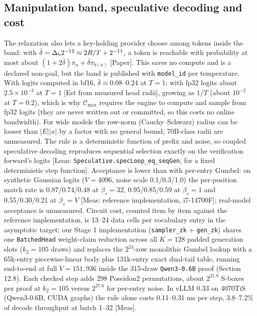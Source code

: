 \documentclass[10pt]{article}
\begin{document}
\subsection{Manipulation band, speculative decoding and cost}
The relaxation also lets a key-holding provider choose among tokens inside the band: with $\bar\delta=\Delta_{\rm b}2^{-12}\approx2R/T+2^{-11}$, a token is reachable with probability at most about $(1+2\bar\delta)\pi_u+\bar\delta\pi_{b(u)}$ [Paper]. This saves no compute and is a declared non-goal, but the band is published with \texttt{model\_\allowbreak{}id} per temperature. With logits computed in bf16, $\bar\delta\approx0.08$--$0.24$ at $T=1$; with fp32 logits about $2.5\times10^{-3}$ at $T=1$ [Est from measured head radii], growing as $1/T$ (about $10^{-2}$ at $T=0.2$), which is why $\mathcal C_{\max}$ requires the engine to compute and sample from fp32 logits (they are never written out or committed, so this costs no online bandwidth). For wide models the row-norm (Cauchy--Schwarz) radius can be looser than $\lvert E\rvert\lvert x\rvert$ by a factor with no general bound; 70B-class radii are unmeasured. The rule is a deterministic function of prefix and noise, so coupled speculative decoding reproduces sequential selection exactly on the verification forward's logits [Lean: \texttt{Speculative.\allowbreak{}specLoop\_\allowbreak{}eq\_\allowbreak{}seqGen}, for a fixed deterministic step function]. Acceptance is lower than with per-entry Gumbel: on synthetic Gaussian logits ($V=4096$, noise scale 0.1/0.3/1.0) the per-position match rate is 0.87/0.74/0.48 at $\beta_s=32$, 0.95/0.85/0.59 at $\beta_s=1$ and 0.55/0.30/0.21 at $\beta_s=V$ [Meas: reference implementation, i7-14700F]; real-model acceptance is unmeasured. Circuit cost, counted item by item against the reference implementation, is 13--24 data cells per vocabulary entry in the asymptotic target; our Stage 1 implementation (\texttt{sampler\_\allowbreak{}zk} + \texttt{gen\_\allowbreak{}zk}) shares one \texttt{BatchedHead} weight-claim reduction across all $K=128$ padded generation slots ($k_2=105$ draws) and replaces the $2^{24}$-row monolithic Gumbel lookup with a 65k-entry piecewise-linear body plus 131k-entry exact dual-tail table, running end-to-end at full $V=151{,}936$ inside the 315-draw \texttt{Qwen3-0.\allowbreak{}6B} proof (Section 12.8). Each checked step adds 298 Poseidon2 permutations, about $2^{21.8}$ S-boxes per proof at $k_2=105$ versus $2^{27.6}$ for per-entry noise. In vLLM 0.33 on 4070TiS (Qwen3-0.6B, CUDA graphs) the rule alone costs 0.11--0.31 ms per step, 3.8--7.2\% of decode throughput at batch 1--32 [Meas].
\end{document}
